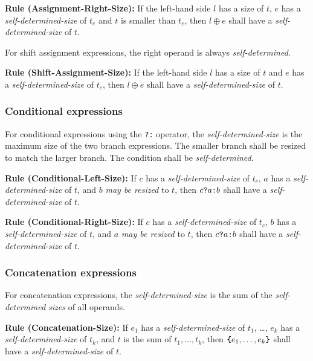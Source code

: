 \documentclass{article}
\newcommand{\sds}{\emph{self-determined-size}}
\newcommand{\mbr}{\emph{may be resized}}
\newenvironment{typingrule}[1]%
{\par\noindent\textbf{Rule (#1):} }%
{\par}
\begin{document}
\begin{typingrule}{Assignment-Right-Size}
  If the left-hand side $l$ has a size of $t$, $e$ has a
  \sds{} of $t_{e}$ and $t$ is smaller than $t_{e}$, then
  $l \oplus e$ shall have a \sds{} of $t$.
\end{typingrule}

For shift assignment expressions, the right operand is always
\emph{self-determined}.

\begin{typingrule}{Shift-Assignment-Size}
  If the left-hand side $l$ has a size of $t$ and $e$ has a
  \sds{} of $t_{e}$, then $l \oplus e$ shall have a
  \sds{} of $t$.
\end{typingrule}

\subsubsection{Conditional expressions}%
\label{conditional-expressions}

For conditional expressions using the \texttt{?:} operator, the
\sds{} is the maximum size of the two branch expressions.
The smaller branch shall be resized to match the larger branch. The condition
shall be \emph{self-determined}.

\begin{typingrule}{Conditional-Left-Size}
  If $c$ has a \sds{} of $t_{c}$, $a$ has a
  \sds{} of $t$, and $b$ \mbr{} to $t$,
  then $c \verb|?| a \verb|:| b$ shall have a \sds{} of
  $t$.
\end{typingrule}

\begin{typingrule}{Conditional-Right-Size}
  If $c$ has a \sds{} of $t_{c}$, $b$ has a
  \sds{} of $t$, and $a$ \mbr{} to $t$,
  then $c \verb|?| a \verb|:| b$ shall have a \sds{} of
  $t$.
\end{typingrule}

\subsubsection{Concatenation expressions}%
\label{concatenation-expressions}

For concatenation expressions, the \sds{} is the sum of the
\emph{self-determined sizes} of all operands.

\begin{typingrule}{Concatenation-Size}
  If $e_{1}$ has a \sds{} of $t_{1}$, \ldots, $e_{k}$ has a
  \sds{} of $t_{k}$, and $t$ is the sum of
  $t_{1}, \dots, t_{k}$, then $\verb|{|e_{1}, \dots, e_{k}\verb|}|$ shall have
  a \sds{} of $t$.
\end{typingrule}
\end{document}
